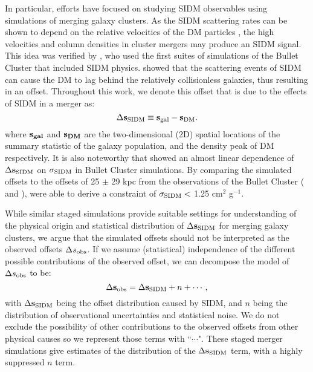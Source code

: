 In particular, efforts have focused on studying SIDM observables 
using simulations of merging galaxy clusters.
As the SIDM scattering rates can be shown to depend on the 
relative velocities of the DM particles \citep{Markevitch2004}, the high
velocities and column densities 
in cluster mergers may produce an SIDM signal. This idea was verified by 
\cite{Randall2008d}, who used the first suites of simulations of the
Bullet Cluster that included SIDM physics. 
\cite{Randall2008d} showed that the scattering events of SIDM can cause the DM
to lag behind the relatively collisionless galaxies, thus resulting in an offset.
Throughout this work, we denote this offset that is due to the effects of SIDM
in a merger as:
\begin{equation}
	\Delta {\bf s}_{{\rm SIDM}} \equiv {\bf s}_{\rm gal} - {\bf s}_{\rm DM}.
	\label{eq:offset}
\end{equation}
where $\bf{s}_{gal}$ and $\bf{s}_{DM}$ are the two-dimensional (2D) spatial
locations of the summary statistic of the galaxy population, and the density
peak of DM respectively. 
It is also noteworthy that \cite{Randall2008d} showed an almost linear dependence of
$\Delta {\bf s}_{{\rm SIDM}}$ on $\sigma_{\rm SIDM}$ in Bullet Cluster simulations. 
By comparing the simulated offsets to the offsets of 25 $\pm$ 29 kpc from 
the observations of the Bullet Cluster
(\citealt{Markevitch2004} and \citealt{Bradac2006b}),
\cite{Randall2008d} were able to derive a constraint of $\sigma_{\rm SIDM} <$ 
1.25 cm$^2$ g$^{-1}$.  

While similar staged simulations provide suitable settings 
for understanding of the physical origin and statistical distribution of $\Delta {\bf s}_{{\rm SIDM}}$
for merging galaxy clusters, 
we argue that the simulated offsets should not be interpreted as the observed
offsets $\Delta s_{\rm obs}$.
If we assume (statistical) independence of 
the different possible contributions of the observed 
offset, we can decompose the model of $\Delta s_{\rm obs}$ to be:
\begin{equation}
	\Delta {\bf s}_{\rm obs} = \Delta {\bf s}_{{\rm SIDM}} + n + \cdots,
	\label{eq:signal_and_noise}
\end{equation}
with $\Delta {\bf s}_{{\rm SIDM}}$ being the offset distribution caused by SIDM, 
and $n$ being the distribution of observational uncertainties and statistical noise.
We do not exclude the possibility of other contributions to the observed
offsets from other physical causes so we represent those terms with ``$\cdots$".
These staged merger simulations give estimates of 
the distribution of the $\Delta {\bf s}_{{\rm SIDM}}$ term, with
a highly suppressed $n$ term. 
  
